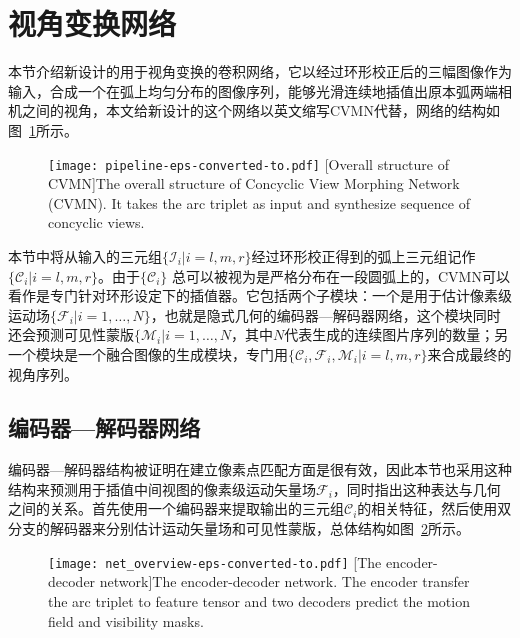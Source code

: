 \section{视角变换网络}
本节介绍新设计的用于视角变换的卷积网络，它以经过环形校正后的三幅图像作为输入，合成一个在弧上均匀分布的图像序列，能够光滑连续地插值出原本弧两端相机之间的视角，本文给新设计的这个网络以英文缩写CVMN代替，网络的结构如图~\ref{fig:cvmn_pipeline}所示。
\begin{figure}[!htbp]
    \centering
    \texttt{[image: pipeline-eps-converted-to.pdf]}
    [Overall structure of CVMN]{The overall structure of Concyclic View Morphing Network (CVMN). It takes the arc triplet as input and synthesize sequence of concyclic views.}
    \label{fig:cvmn_pipeline}
\end{figure}
本节中将从输入的三元组$\{\mathcal{I}_i | i=l, m, r\}$经过环形校正得到的弧上三元组记作$\{\mathcal{C}_i | i=l, m, r\}$。由于$\{\mathcal{C}_i\}$ 总可以被视为是严格分布在一段圆弧上的，CVMN可以看作是专门针对环形设定下的插值器。它包括两个子模块：一个是用于估计像素级运动场$\{\mathcal{F}_i | i=1, \dots, N\}$，也就是隐式几何的编码器---解码器网络，这个模块同时还会预测可见性蒙版$\{\mathcal{M}_i | i=1, \dots, N$，其中$N$代表生成的连续图片序列的数量；另一个模块是一个融合图像的生成模块，专门用$\{\mathcal{C}_i, \mathcal{F}_i, \mathcal{M}_i | i = l, m, r\}$来合成最终的视角序列。

\subsection{编码器---解码器网络}
编码器---解码器结构被证明在建立像素点匹配方面是很有效\citep{Ilg_2017_CVPR, newell2016}，因此本节也采用这种结构来预测用于插值中间视图的像素级运动矢量场$\mathcal{F}_i$，同时指出这种表达与几何之间的关系。首先使用一个编码器来提取输出的三元组$\mathcal{C}_i$的相关特征，然后使用双分支的解码器来分别估计运动矢量场和可见性蒙版，总体结构如图~\ref{fig:cvmn_encoder_decoder}所示。
\begin{figure}[!htbp]
    \centering
    \texttt{[image: net\_overview-eps-converted-to.pdf]}
    [The encoder-decoder network]{The encoder-decoder network. The encoder transfer the arc triplet to feature tensor and two decoders predict the motion field and visibility masks.}
    \label{fig:cvmn_encoder_decoder}
\end{figure}

